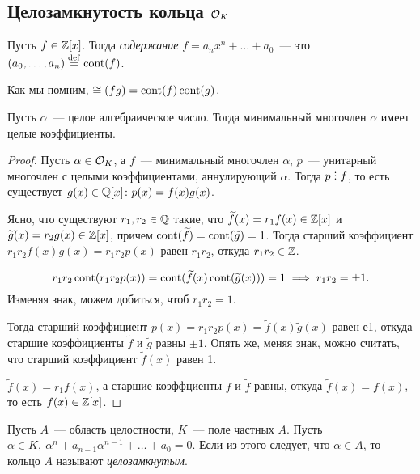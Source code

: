  	\subsection{Целозамкнутость кольца $\mathcal{O}_{K}$}

 	\begin{definition} 
 		Пусть $f \in \mathbb{Z}[x]$. Тогда \emph{содержание} $f = a_n x^n + \ldots + a_0$~--- это $(a_0, \ldots, a_n) \stackrel{\mathrm{def}}{=} \operatorname{cont}(f)$.
 	\end{definition}
 	\begin{remark}
 		Как мы помним, $\cong(f g) = \operatorname{cont}(f)\operatorname{cont}(g)$.
 	\end{remark}

 	\begin{theorem}\label{minimal_polynomial} 
 		Пусть $\alpha$~--- целое алгебраическое число. Тогда минимальный многочлен $\alpha$ имеет целые коэффициенты. 
 	\end{theorem}
 	\begin{proof}
 		Пусть $\alpha \in \mathcal{O}_{K}$, а $f$~--- минимальный многочлен $\alpha$, $p$~--- унитарный многочлен с целыми коэффициентами, аннулирующий $\alpha$. Тогда $p \divby f$, то есть существует $g(x) \in \mathbb{Q}[x]\colon p(x) = f(x) g(x)$. 

 		Ясно, что существуют $r_1, r_2 \in \mathbb{Q}$ такие, что $\widetilde{f}(x) = r_1 f(x) \in \mathbb{Z}[x]$ и $\widetilde{g}(x) = r_2 g(x) \in \mathbb{Z}[x]$, причем $\operatorname{cont}(\widetilde{f}) = \operatorname{cont}(\widetilde{g}) = 1$. Тогда старший коэффициент $r_1 r_2 f(x) g(x) = r_1 r_2 p(x)$  равен $r_1 r_2$, откуда $r_1 r_2 \in \mathbb{Z}$. 

 		\[
 			r_1 r_2 \operatorname{cont}(r_1 r_2 p(x)) = \operatorname{cont}(\widetilde{f}(x) \operatorname{cont}(\widetilde{g}(x))) = 1 \implies r_1 r_2 = \pm 1. 
 		\]
 		Изменяя знак, можем добиться, чтоб $r_1 r_2 = 1$.  

 		Тогда старший коэффициент $p(x) = r_1 r_2 p(x) = \widetilde{f}(x) \widetilde{g}(x)$ равен е1, откуда старшие коэффициенты $\widetilde{f}$ и $\widetilde{g}$ равны  $\pm 1$. Опять же, меняя знак, можно считать, что старший коэффициент $\widetilde{f}(x)$ равен 1. 

 		$\widetilde{f}(x) = r_1 f(x)$, а старшие коэффциенты $f$ и $\widetilde{f}$ равны, откуда $\widetilde{f}(x) = f(x)$, то есть $f(x) \in \mathbb{Z}[x]$.
 	\end{proof}

 	\begin{definition} 
 		Пусть $A$~--- область целостности, $K$~--- поле частных $A$. Пусть $\alpha \in K, \ \alpha^n + a_{n - 1}\alpha^{n - 1} + \ldots + a_0 = 0$. Если из этого следует, что $\alpha \in A$, то кольцо $A$ называют \emph{целозамкнутым}. 
 	\end{definition}

